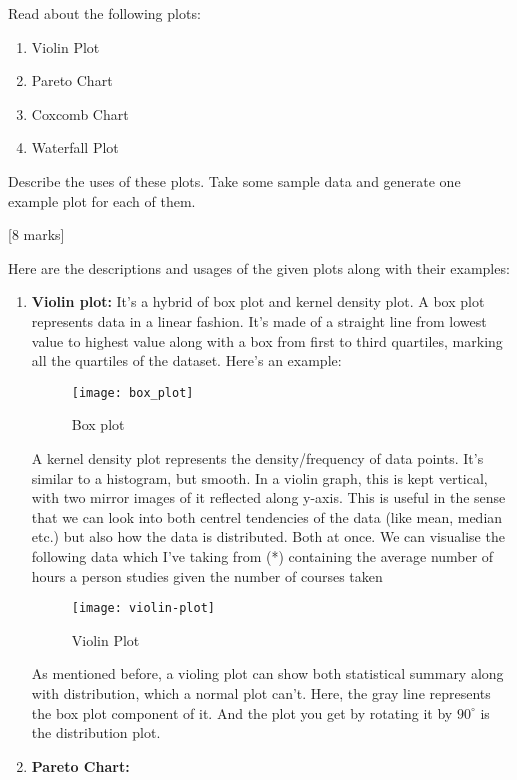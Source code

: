 \begin{que}
	Read about the following plots:
	\begin{enumerate}
		\item Violin Plot
		\item Pareto Chart
		\item Coxcomb Chart
		\item Waterfall Plot
	\end{enumerate}
	Describe the uses of these plots. Take some sample data and generate one example plot
	for each of them.

	\hspace*{\fill} [8 marks]
\end{que}

\begin{tcolorbox}[breakable]
	\begin{sol}
		Here are the descriptions and usages of the given plots along with their examples:
		\begin{enumerate}
			\item \textbf{Violin plot:} It's a hybrid of box plot and kernel density plot.
			      A box plot represents data in a linear fashion. It's made of a straight line
			      from lowest value to highest value along with a box from first to third
			      quartiles, marking all the quartiles of the dataset. Here's an example:
			      \begin{figure}[H]
				      \centering
				      \texttt{[image: box\_plot]}
				      \caption{Box plot}
				      \label{fig:box}
			      \end{figure}
			      A kernel density plot represents the density/frequency of data points. It's
			      similar to a histogram, but smooth. In a violin graph, this is kept vertical,
			      with two mirror images of it reflected along y-axis. This is useful in the
			      sense that we can look into both centrel tendencies of the data (like mean,
			      median etc.) but also how the data is distributed. Both at once. We can
			      visualise the following data which I've taking from (*) containing the average
			      number of hours a person studies given the number of courses taken
			      \begin{figure}[H]
				      \centering
				      \texttt{[image: violin-plot]}
				      \caption{Violin Plot}
				      \label{fig:violin}
			      \end{figure}
			      As mentioned before, a violing plot can show both statistical summary along
			      with distribution, which a normal plot can't. Here, the gray line represents
			      the box plot component of it. And the plot you get by rotating it by $90^\circ$
			      is the distribution plot.
			\item \textbf{Pareto Chart:}
		\end{enumerate}
	\end{sol}
\end{tcolorbox}
